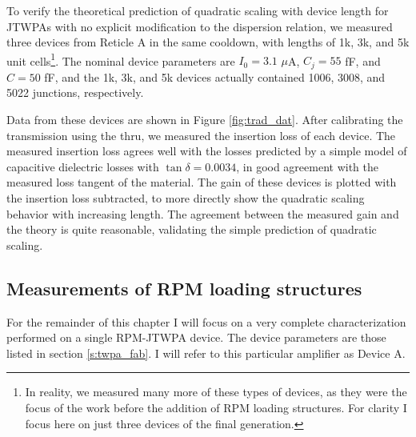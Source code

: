 To verify the theoretical prediction of quadratic scaling with device length for JTWPAs with no explicit modification to the dispersion relation, we measured three devices from Reticle A in the same cooldown, with lengths of 1k, 3k, and 5k unit cells\footnote{In reality, we measured many more of these types of devices, as they were the focus of the work before the addition of RPM loading structures.  For clarity I focus here on just three devices of the final generation.}.  The nominal device parameters are $I_0 = 3.1$ $\mu$A, $C_j = 55$ fF, and $C = 50$ fF, and the 1k, 3k, and 5k devices actually contained 1006, 3008, and 5022 junctions, respectively.

Data from these devices are shown in Figure \ref{fig:trad_dat}.  After calibrating the transmission using the thru, we measured the insertion loss of each device.  The measured insertion loss agrees well with the losses predicted by a simple model of capacitive dielectric losses with $\tan{\delta} = 0.0034$, in good agreement with the measured loss tangent of the material.  The gain of these devices is plotted with the insertion loss subtracted, to more directly show the quadratic scaling behavior with increasing length.  The agreement between the measured gain and the theory is quite reasonable, validating the simple prediction of quadratic scaling.

\subsection{Measurements of RPM loading structures}

For the remainder of this chapter I will focus on a very complete characterization performed on a single RPM-JTWPA device.  The device parameters are those listed in section \ref{s:twpa_fab}.  I will refer to this particular amplifier as Device A.

